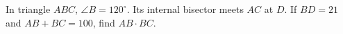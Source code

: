 In triangle $ABC$, $\angle B=120^\circ$. Its internal bisector meets $AC$ at $D$. If $BD=21$ and $AB+BC=100$, find $AB\cdot BC$.
